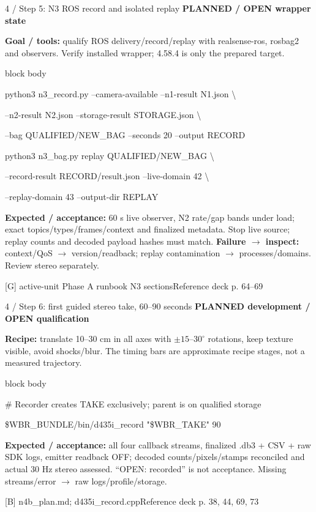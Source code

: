 \documentclass[aspectratio=169,12pt,t]{beamer}
\newcommand{\evidence}[1]{{\small\bfseries\color{teal!70!black}#1}\par\medskip}
\newcommand{\src}[2]{\vfill\par{\footnotesize\color{muted}#1\quad Reference deck p. #2}\par}
\newcommand{\code}[1]{\par\smallskip\begin{beamercolorbox}[wd=\linewidth,sep=2mm]{block body}{\ttfamily\small #1}\end{beamercolorbox}\par\smallskip}
\begin{document}
\begin{frame}{4 / Step 5: N3 ROS record and isolated replay}
\evidence{PLANNED / OPEN wrapper state}

\textbf{Goal / tools:} qualify ROS delivery/record/replay with realsense-ros, rosbag2 and observers. Verify installed wrapper; 4.58.4 is only the prepared target.
\code{python3 n3\_record.py --camera-available --n1-result N1.json \textbackslash{}\par \quad --n2-result N2.json --storage-result STORAGE.json \textbackslash{}\par \quad --bag QUALIFIED/NEW\_BAG --seconds 20 --output RECORD\par python3 n3\_bag.py replay QUALIFIED/NEW\_BAG \textbackslash{}\par \quad --record-result RECORD/result.json --live-domain 42 \textbackslash{}\par \quad --replay-domain 43 --output-dir REPLAY}
\medskip \textbf{Expected / acceptance:} 60 s live observer, N2 rate/gap bands under load; exact topics/types/frames/context and finalized metadata. Stop live source; replay counts and decoded payload hashes must match.
\medskip \textbf{Failure $\to$ inspect:} context/QoS $\to$ version/readback; replay contamination $\to$ processes/domains. Review stereo separately.

\src{[G] active-unit Phase A runbook N3 sections}{64--69}
\end{frame}

\begin{frame}{4 / Step 6: first guided stereo take, 60--90 seconds}
\evidence{PLANNED development / OPEN qualification}

\begin{center}\end{center}
\medskip \textbf{Recipe:} translate 10--30 cm in all axes with $\pm15$--$30^\circ$ rotations, keep texture visible, avoid shocks/blur. The timing bars are approximate recipe stages, not a measured trajectory.
\code{\# Recorder creates TAKE exclusively; parent is on qualified storage\par \$WBR\_BUNDLE/bin/d435i\_record "\$WBR\_TAKE" 90}
\medskip \textbf{Expected / acceptance:} all four callback streams, finalized .db3 + CSV + raw SDK logs, emitter readback OFF; decoded counts/pixels/stamps reconciled and actual 30 Hz stereo assessed. ``OPEN: recorded'' is not acceptance. Missing streams/error $\to$ raw logs/profile/storage.

\src{[B] n4b\_plan.md; d435i\_record.cpp}{38, 44, 69, 73}
\end{frame}
\end{document}
